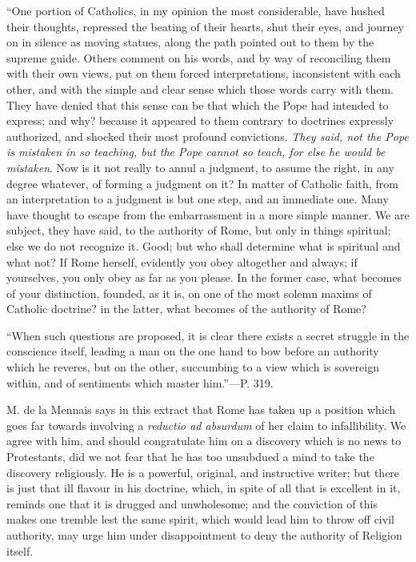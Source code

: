 ``One
portion of Catholics, in my opinion the most considerable, have hushed
their thoughts, repressed the beating of their hearts, shut their
eyes, and journey on in silence as moving statues, along the path
pointed out to them by the supreme guide. Others comment on his words,
and by way of reconciling them with their own views, put on them
forced interpretations, inconsistent with each other, and with the
simple and clear sense which those words carry with them. They have
denied that this sense can be that which the Pope had intended to
express; and why? because it appeared to them contrary to doctrines
expressly authorized, and shocked their most profound convictions. \emph{They
said, not the Pope is mistaken in so teaching, but the Pope cannot so
teach, for else he would be mistaken}. Now is it not really to
annul a judgment, to assume the right, in any degree whatever, of
forming a judgment on it? In matter of Catholic faith, from an
interpretation to a judgment is but one step, and an immediate one.
Many have thought to escape from the embarrassment in a more simple
manner. We are subject, they have said, to the authority of Rome, but
only in things spiritual; else we do not recognize it. Good; but who
shall determine what is spiritual and what not? If Rome herself,
evidently you obey altogether and always; if yourselves, you only obey
as far as you please. In the former case, what becomes of your
distinction, founded, as it is, on one of the most solemn maxims of
Catholic doctrine? in the latter, what becomes of the authority of
Rome?

``When
such questions are proposed, it is clear there exists a secret
struggle in the conscience itself, leading a man on the one hand to
bow before an authority which he reveres, but on the other, succumbing
to a view which is sovereign within, and of sentiments which master
him.''—P. 319.

M. de la Mennais says in this extract that Rome
has taken up a position which goes far towards involving a \emph{reductio
ad absurdum} of her claim to infallibility. We agree with him, and
should congratulate him on a discovery which is no news to
Protestants, did we not fear that he has too unsubdued a mind to take
the discovery religiously. He is a powerful, original, and instructive
writer; but there is just that ill flavour in his doctrine, which, in
spite of all that is excellent in it, reminds one that it is drugged
and unwholesome; and the conviction of this makes one tremble lest the
same spirit, which would lead him to throw off civil authority, may
urge him under disappointment to deny the authority of Religion
itself.

